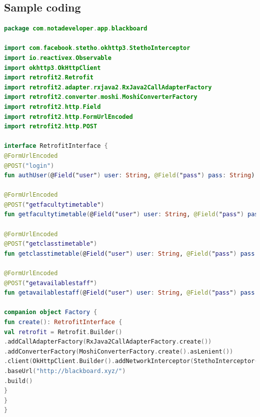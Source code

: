 \documentclass[BTech]{srmuthesis}
\begin{document}
\subsection{Sample coding}
\begin{lstlisting}[language=Kotlin,caption={Retrofit Interface}, label={lst:retrofit}]
package com.notadeveloper.app.blackboard

import com.facebook.stetho.okhttp3.StethoInterceptor
import io.reactivex.Observable
import okhttp3.OkHttpClient
import retrofit2.Retrofit
import retrofit2.adapter.rxjava2.RxJava2CallAdapterFactory
import retrofit2.converter.moshi.MoshiConverterFactory
import retrofit2.http.Field
import retrofit2.http.FormUrlEncoded
import retrofit2.http.POST

interface RetrofitInterface {
@FormUrlEncoded
@POST("login")
fun authUser(@Field("user") user: String, @Field("pass") pass: String): Observable<Faculty>

@FormUrlEncoded
@POST("getfacultytimetable")
fun getfacultytimetable(@Field("user") user: String, @Field("pass") pass: String, @Field("id") id: String): Observable<timetable>

@FormUrlEncoded
@POST("getclasstimetable")
fun getclasstimetable(@Field("user") user: String, @Field("pass") pass: String, @Field("class") class: String): Observable<timetable>

@FormUrlEncoded
@POST("getavailablestaff")
fun getavailablestaff(@Field("user") user: String, @Field("pass") pass: String, @Field("day") day: String, @Field("hour") hour: String): Observable<List<String>>

companion object Factory {
fun create(): RetrofitInterface {
val retrofit = Retrofit.Builder()
.addCallAdapterFactory(RxJava2CallAdapterFactory.create())
.addConverterFactory(MoshiConverterFactory.create().asLenient())
.client(OkHttpClient.Builder().addNetworkInterceptor(StethoInterceptor()).build())
.baseUrl("http://blackboard.xyz/")
.build()
}
}
}
\end{lstlisting}
\end{document}

